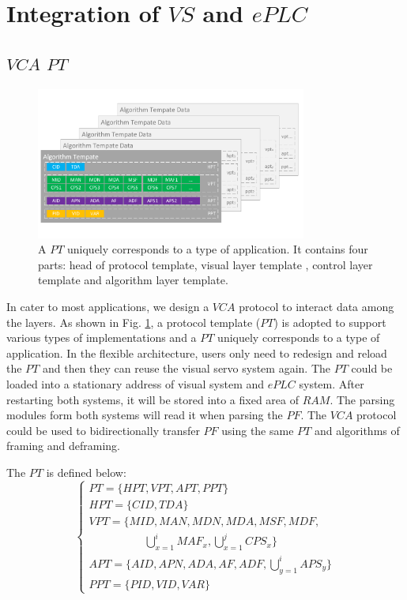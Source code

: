 \documentclass[journal,UTF8]{IEEEtran}
\begin{document}
\section{Integration of $VS$ and $ePLC$}
\label{Integration}

\subsection{$VCA$ $PT$}
\begin{figure}
\centering
\includegraphics[width=3.5in]{fig/PT.pdf}
\caption{A $PT$ uniquely corresponds to a type of application. It contains four parts: head of protocol template, visual layer template , control layer template and algorithm layer template.}
\label{fig:PT}
\end{figure}
In cater to most applications, we design a $VCA$ protocol to interact data among the layers. As shown in Fig. \ref{fig:PT}, a protocol template ($PT$) is adopted to support various types of implementations and a $PT$ uniquely corresponds to a type of application. In the flexible architecture, users only need to redesign and reload the $PT$ and then they can reuse the visual servo system again. The $PT$ could be loaded into a stationary address of visual system and $ePLC$ system. After restarting both systems, it will be stored into a fixed area of $RAM$. The parsing modules form both systems will read it when parsing the $PF$. The $VCA$ protocol could be used to bidirectionally transfer $PF$ using the same $PT$ and algorithms of framing and deframing.  
 
 The $PT$ is defined below:
  \begin{equation}
 \left\{
 \begin{array}{l}
 PT = \{HPT, VPT, APT, PPT\}\\
 HPT = \{CID, TDA\}\\
 VPT = \{MID, MAN, MDN, MDA, MSF, MDF, \\
 \qquad\qquad\quad \bigcup_{x=1}^i MAF_x, \bigcup_{x=1}^j CPS_x\}\\
 APT = \{AID, APN, ADA, AF, ADF, \bigcup_{y=1}^i APS_y\}\\
 PPT = \{PID, VID, VAR\}
 \end{array}
 \right.
 \end{equation}
 
\end{document}
